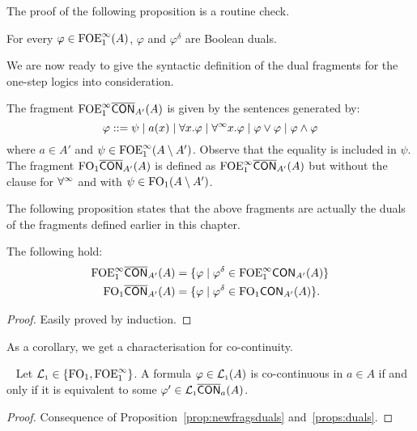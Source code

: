 \noindent The proof of the following proposition is a routine check.

\begin{proposition}\label{props:duals}
For every $\varphi \in \mathrm{FOE}^{\infty}_1(A)$, $\varphi$ and $\varphi^{\delta}$ are Boolean duals.
\end{proposition}

We are now ready to give the syntactic definition of the dual fragments for the one-step logics into consideration.

\begin{definition}\label{def:cocontfrag}\label{def:multfrag}
The fragment $\mathrm{FOE}^{\infty}_1\overline{\mathsf{CON}}_{A'}(A)$ is given by the sentences generated by:
\[
\varphi ::= \psi \mid a(x) \mid \forall x.\varphi \mid \forall^\infty x.\varphi \mid \varphi \lor \varphi \mid \varphi \land \varphi
\]
where $a\in A'$ and $\psi \in \mathrm{FOE}^{\infty}_1(A\setminus A')$. Observe that the equality is included in $\psi$. The fragment $\mathrm{FO}_1\overline{\mathsf{CON}}_{A'}(A)$ is defined as $\mathrm{FOE}^{\infty}_1\overline{\mathsf{CON}}_{A'}(A)$ but without the clause for $\forall^\infty$ and with $\psi\in \mathrm{FO}_1(A\setminus A')$.
\end{definition}

The following proposition states that the above fragments are actually the duals of the fragments defined earlier in this chapter.

\begin{proposition}\label{prop:newfragsduals}
The following hold:
	\begin{align*}
		\mathrm{FOE}^{\infty}_1\overline{\mathsf{CON}}_{A'}(A) &= \{\varphi \mid \varphi^\delta \in \mathrm{FOE}^{\infty}_1\mathsf{CON}_{A'}(A)\} \\
		\mathrm{FO}_1\overline{\mathsf{CON}}_{A'}(A) &= \{\varphi \mid \varphi^\delta \in \mathrm{FO}_1\mathsf{CON}_{A'}(A)\}.
	\end{align*}
\end{proposition}
\begin{proof}
	Easily proved by induction.
\end{proof}

\noindent As a corollary, we get a characterisation for co-continuity.

\begin{corollary}~
	Let $\mathcal{L}_{\scriptscriptstyle 1} \in \{\mathrm{FO}_1,\mathrm{FOE}^{\infty}_1\}$. A formula $\varphi \in \mathcal{L}_{\scriptscriptstyle 1}(A)$ is co-continuous in $a\in A$ if and only if it is equivalent to some $\varphi' \in \mathcal{L}_{\scriptscriptstyle 1}\overline{\mathsf{CON}}_{a}(A)$.
\end{corollary}
\begin{proof}
	Consequence of Proposition~\ref{prop:newfragsduals} and~\ref{props:duals}.
\end{proof}
